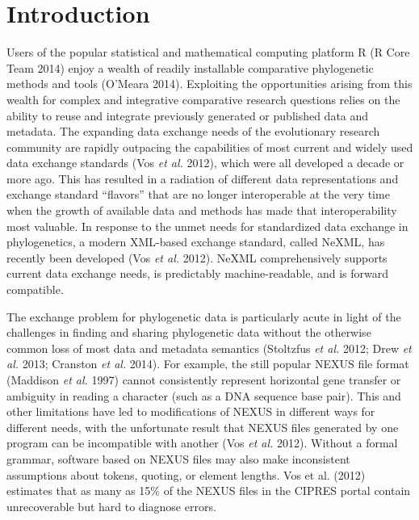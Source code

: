 \documentclass[author-year, review, 11pt]{elsarticle} %
\begin{document}
\section{Introduction}\label{introduction}

Users of the popular statistical and mathematical computing platform R
(R Core Team 2014) enjoy a wealth of readily installable comparative
phylogenetic methods and tools (O'Meara 2014). Exploiting the
opportunities arising from this wealth for complex and integrative
comparative research questions relies on the ability to reuse and
integrate previously generated or published data and metadata. The
expanding data exchange needs of the evolutionary research community are
rapidly outpacing the capabilities of most current and widely used data
exchange standards (Vos \emph{et al.} 2012), which were all developed a
decade or more ago. This has resulted in a radiation of different data
representations and exchange standard ``flavors'' that are no longer
interoperable at the very time when the growth of available data and
methods has made that interoperability most valuable. In response to the
unmet needs for standardized data exchange in phylogenetics, a modern
XML-based exchange standard, called NeXML, has recently been developed
(Vos \emph{et al.} 2012). NeXML comprehensively supports current data
exchange needs, is predictably machine-readable, and is forward
compatible.

The exchange problem for phylogenetic data is particularly acute in
light of the challenges in finding and sharing phylogenetic data without
the otherwise common loss of most data and metadata semantics (Stoltzfus
\emph{et al.} 2012; Drew \emph{et al.} 2013; Cranston \emph{et al.}
2014). For example, the still popular NEXUS file format (Maddison
\emph{et al.} 1997) cannot consistently represent horizontal gene
transfer or ambiguity in reading a character (such as a DNA sequence
base pair). This and other limitations have led to modifications of
NEXUS in different ways for different needs, with the unfortunate result
that NEXUS files generated by one program can be incompatible with
another (Vos \emph{et al.} 2012). Without a formal grammar, software
based on NEXUS files may also make inconsistent assumptions about
tokens, quoting, or element lengths. Vos et al. (2012) estimates that as
many as 15\% of the NEXUS files in the CIPRES portal contain
unrecoverable but hard to diagnose errors.
\end{document}
